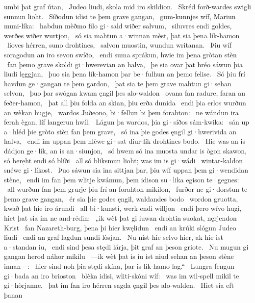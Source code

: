 umbi þat graf útan, \hld\ Judeo liudi,
skola mid iro skildion. \hld\ Skréd forð-wardes
swigli sunnun lioht. \hld\ Síðodun idisi
te þem grave gangan, \hld\ gum-kunnjes wíf,
Mariun muni-líka: \hld\ habdun mèðmo filo
gi·sald wiðer salvum, \hld\ siluvres endi goldes,
werðes wiðer wurtjon, \hld\ só sia mahtun a·winnan mèst,
þat sia þena lík-hamon \hld\ lioves hérren,
suno drohtines, \hld\ salvon muostin,
wundun writanan. \hld\ Þiu wíf soragodun
an iro sevon swíðo, \hld\ endi suma sprákun,
hwie im þena gròtan stèn \hld\ fan þemo grave skoldi
gi·hwerevian an halva, \hld\ þe sia ovar þat hréo sáwun
þia liudi lęggjan, \hld\ þuo sia þena lík-hamon þar
be·fulhun an þemo felise. \hld\ Só þiu frí havdun
ge·gangan te þem gardon, \hld\ þat sia te þem grave mahtun
gi·sehan selvon, \hld\ þuo þar swógan kwam
ęngil þes alo-waldon \hld\ ovana fan radure,
faran an feðer-hamon, \hld\ þat all þiu folda an skian,
þiu erða dunida \hld\ endi þia erlos wurðun
an wèkan hugje, \hld\ wardos Juðeono,
bi·fellun bi þem forahton: \hld\ ne wándun ira ferah ègan,
líf langerun hwíl. \hld\ Lágun þa wardos,
þia gi·síðos sám-kwika: \hld\ sán up a·hléd
þie gròto stèn fan þem grave, \hld\ só ina þie godes ęngil
gi·hwerivida an halva, \hld\ endi im uppan þem hlèwe gi·sat
diur-lík drohtines bodo. \hld\ Hie was an is dádjon ge·lík,
an is an·siunjon, \hld\ só hwem só ina muosta undar is ògon skawon,
só berẹht endi só blíði \hld\ all só bliksmun lioht;
was im is gi·wádi \hld\ wintạr-kaldon
snéwe gi·líkost. \hld\ Þuo sáwun sia ina sittjan þar,
þiu wíf uppan þem gi·wendidan stène, \hld\ endi im fan þem wlitje kwámun,
þem idison su·lika egison te·gegnes: \hld\ all wurðun fan þem grurje
þiu frí an forahton mikilon, \hld\ furðor ne gi·dorstun
te þemo grave gangan, \hld\ ér sia þie godes ęngil,
waldandes bodo \hld\ wordon gruotta,
kwað þat hie iro árundi \hld\ all bi·kunsti,
werk endi willjon \hld\ endi þero wívo hugi,
hiet þat sia im ne and-rédin: \hld\ „ik wèt þat gi iuwan drohtin suokat,
nęrjendon Krist \hld\ fan Nazareth-burg,
þena þi hier kwęlidun \hld\ endi an krúki slógun
Judeo liudi \hld\ endi an graf lagdun
sundi-lòsjan. \hld\ Nu nist hie selvo hier,
ak hie ist a·standan iu, \hld\ endi sind þesa stędi lárja, %
þit graf an þeson griote. \hld\ Nu mugun gi gangan herod
náhor mikilu \hld\ —ik wèt þat is iu ist niud sehan
an þeson stène innan—: \hld\ hier sind noh þia stędi skína,
þar is lík-hamo lag.“ \hld\ Lungra fengun
gi·bada an iro brioston \hld\ blèka idisi,
wliti-skóni wíf: \hld\ was im wil-spell mikil
te gi·hòrjanne, \hld\ þat im fan iro hérren sagda
ęngil þes alo-walden. \hld\ Hiet sia eft þanan
